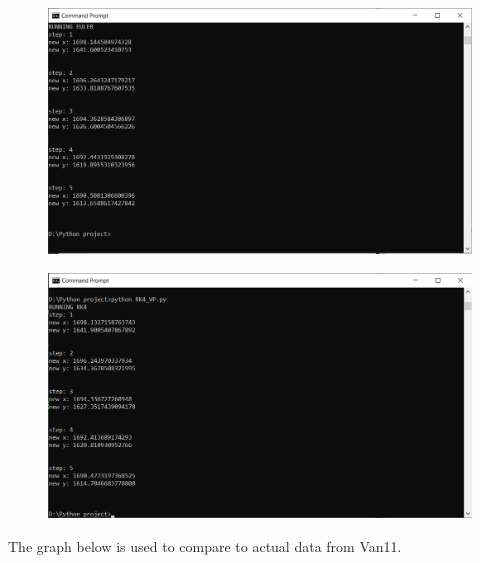 \documentclass[a4paper]{article}
\numberwithin{equation}{section}
\begin{document}
\begin{figure}[H]
  \centering
  \includegraphics[width=15cm]{Result5_Euler.png}
\end{figure}
\begin{figure}[H]
  \centering
  \includegraphics[width=15cm]{Result5_RK4.png}
\end{figure}

The graph below is used to compare to actual data from Van11.
\end{document}
